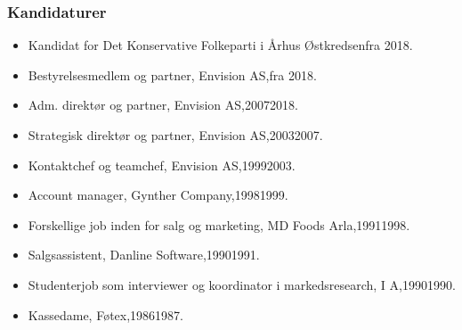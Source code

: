 \documentclass[11pt, a4paper]{awesome-cv}
\begin{document}
\begin{cvletter}
\subsubsection*{Kandidaturer}
\begin{itemize}
\item Kandidat for Det Konservative Folkeparti i Århus Østkredsenfra 2018.
\end{itemize}
\begin{itemize}
\item Bestyrelsesmedlem og partner, Envision AS,fra 2018.
\item Adm. direktør og partner, Envision AS,20072018.
\item Strategisk direktør og partner, Envision AS,20032007.
\item Kontaktchef og teamchef, Envision AS,19992003.
\item Account manager, Gynther  Company,19981999.
\item Forskellige job inden for salg og marketing, MD Foods Arla,19911998.
\item Salgsassistent, Danline Software,19901991.
\item Studenterjob som interviewer og koordinator i markedsresearch, I  A,19901990.
\item Kassedame, Føtex,19861987.
\end{itemize}
\end{cvletter}
\end{document}

